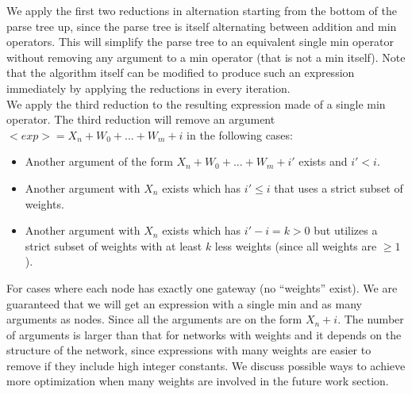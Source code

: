We apply the first two reductions in alternation starting from the bottom of the parse tree up, since the parse tree is itself alternating between addition and min operators. This will simplify the parse tree to an equivalent single min operator without removing any argument to a min operator (that is not a min itself). Note that the algorithm itself can be modified to produce such an expression immediately by applying the reductions in every iteration. \\

We apply the third reduction to the resulting expression made of a single min operator. The third reduction will remove an argument $<exp> = X_n + W_0 + ... + W_m + i$ in the following cases:
\begin{itemize}
\item Another argument of the form $X_n + W_0 + ... + W_m + i'$ exists and $i' < i$.
\item Another argument with $X_n$ exists which has $i' \leq i$ that uses a strict subset of weights.
\item Another argument with $X_n$ exists which has $i' - i = k > 0$ but utilizes a strict subset of weights with at least $k$ less weights (since all weights are $\geq 1$).
\end{itemize}

For cases where each node has exactly one gateway (no ``weights'' exist). We are guaranteed that we will get an expression with a single min and as many arguments as nodes. Since all the arguments are on the form $X_n + i$. The number of arguments is larger than that for networks with weights and it depends on the structure of the network, since expressions with many weights are easier to remove if they include high integer constants. We discuss possible ways to achieve more optimization when many weights are involved in the future work section.